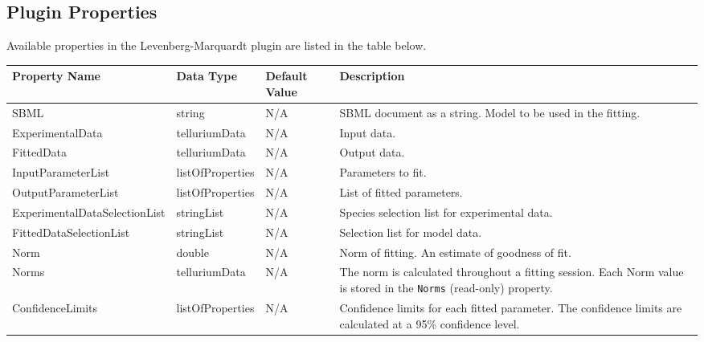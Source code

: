 \begin{landscape}
\section{Plugin Properties}
Available properties in the Levenberg-Marquardt plugin are listed in the table below.

\centering %
\begin{longtable}{p{4cm} l p{3cm}  p{10cm}} %

Property Name & Data Type & Default Value  & Description \\ [0.5ex] %
\hline %
SBML                            &   string              & N/A    &   SBML document as a string. Model to be used in the fitting. \\
ExperimentalData   				&	telluriumData 		& N/A    &   Input data.  \\
FittedData      				& 	telluriumData    	& N/A    &   Output data. \\
InputParameterList 				&	listOfProperties    & N/A    &   Parameters to fit. \\
OutputParameterList 			&   listOfProperties 	& N/A    &   List of fitted parameters. \\
Experimental\-DataSelectionList & 	stringList			& N/A    &   Species selection list for experimental data. \\
FittedDataSelectionList     	& 	stringList			& N/A    &   Selection list for model data. \\
Norm							&	double				& N/A    &   Norm of fitting. An estimate of goodness of fit. \\
Norms							&	telluriumData		& N/A    &   The norm is calculated throughout a fitting session. Each Norm value is stored in the 	\verb|Norms| (read-only) property. \\

ConfidenceLimits				&	listOfProperties	& N/A    &   Confidence limits for each fitted parameter. The confidence limits are calculated at a 95\% confidence level. \\


\end{longtable}
\end{landscape}

